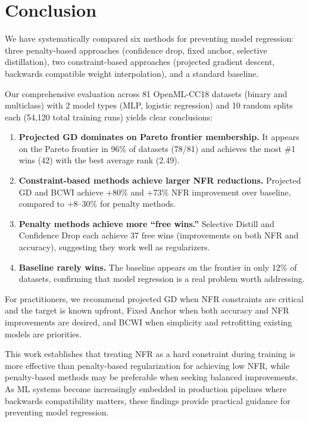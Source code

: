 \documentclass[12pt, letterpaper]{article}
\theoremstyle{remark}
\begin{document}
\section{Conclusion}

We have systematically compared six methods for preventing model regression: three penalty-based approaches (confidence drop, fixed anchor, selective distillation), two constraint-based approaches (projected gradient descent, backwards compatible weight interpolation), and a standard baseline.

Our comprehensive evaluation across 81 OpenML-CC18 datasets (binary and multiclass) with 2 model types (MLP, logistic regression) and 10 random splits each (54,120 total training runs) yields clear conclusions:

\begin{enumerate}
\item \textbf{Projected GD dominates on Pareto frontier membership.} It appears on the Pareto frontier in 96\% of datasets (78/81) and achieves the most \#1 wins (42) with the best average rank (2.49).

\item \textbf{Constraint-based methods achieve larger NFR reductions.} Projected GD and BCWI achieve +80\% and +73\% NFR improvement over baseline, compared to +8--30\% for penalty methods.

\item \textbf{Penalty methods achieve more ``free wins.''} Selective Distill and Confidence Drop each achieve 37 free wins (improvements on both NFR and accuracy), suggesting they work well as regularizers.

\item \textbf{Baseline rarely wins.} The baseline appears on the frontier in only 12\% of datasets, confirming that model regression is a real problem worth addressing.
\end{enumerate}

For practitioners, we recommend projected GD when NFR constraints are critical and the target is known upfront, Fixed Anchor when both accuracy and NFR improvements are desired, and BCWI when simplicity and retrofitting existing models are priorities.

This work establishes that treating NFR as a hard constraint during training is more effective than penalty-based regularization for achieving low NFR, while penalty-based methods may be preferable when seeking balanced improvements. As ML systems become increasingly embedded in production pipelines where backwards compatibility matters, these findings provide practical guidance for preventing model regression.





\end{document}
